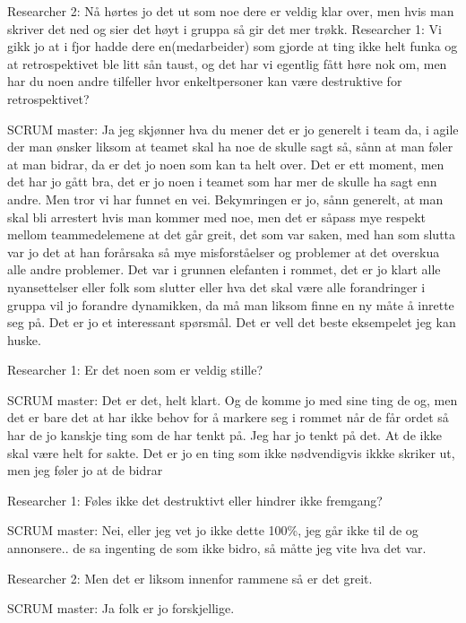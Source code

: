 \documentclass[12pt, a4paper]{report}
\begin{document}
Researcher 2: Nå hørtes jo det ut som noe dere er veldig klar over, men hvis man skriver det ned og sier det høyt i gruppa så gir det mer trøkk.
Researcher 1: Vi gikk jo at i fjor hadde dere en(medarbeider) som gjorde at ting ikke helt funka og at retrospektivet ble litt sån taust, og det har vi egentlig fått høre nok om, men har du noen andre tilfeller hvor enkeltpersoner kan være destruktive for retrospektivet?

SCRUM master: Ja jeg skjønner hva du mener det er jo generelt i team da, i agile der man ønsker liksom at teamet skal ha noe de skulle sagt så, sånn at man føler at man bidrar, da er det jo noen som kan ta helt over. Det er ett moment, men det har jo gått bra, det er jo noen i teamet som har mer de skulle ha sagt enn andre. Men tror vi har funnet en vei. Bekymringen er jo, sånn generelt, at man skal bli arrestert hvis man kommer med noe, men det er såpass mye respekt mellom teammedelemene at det går greit, det som var saken, med han som slutta var jo det at han forårsaka så mye misforståelser og problemer at det overskua alle andre problemer. Det var i grunnen elefanten i rommet, det er jo klart alle nyansettelser eller folk som slutter eller hva det skal være alle forandringer i gruppa vil jo forandre dynamikken, da må man liksom finne en ny måte å inrette seg på. Det er jo et interessant spørsmål. Det er vell det beste eksempelet jeg kan huske.

Researcher 1: Er det noen som er veldig stille?

SCRUM master: Det er det, helt klart. Og de komme jo med sine ting de og, men det er bare det at har ikke behov for å markere seg i rommet når de får ordet så har de jo kanskje ting som de har tenkt på. Jeg har jo tenkt på det. At de ikke skal være helt for sakte. Det er jo en ting som ikke nødvendigvis ikkke skriker ut, men jeg føler jo at de bidrar

Researcher 1: Føles ikke det destruktivt eller hindrer ikke fremgang?

SCRUM master: Nei, eller jeg vet jo ikke dette 100\%, jeg går ikke til de og annonsere.. de sa ingenting de som ikke bidro, så måtte jeg vite hva det var.

Researcher 2: Men det er liksom innenfor rammene så er det greit.

SCRUM master: Ja folk er jo forskjellige.
\end{document}

